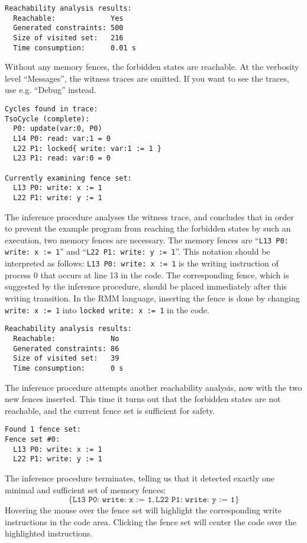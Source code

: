 \documentclass[a4paper]{article}
\begin{document}
\noindent
\begin{verbatim}
Reachability analysis results:
  Reachable:             Yes
  Generated constraints: 500
  Size of visited set:   216
  Time consumption:      0.01 s
\end{verbatim}

Without any memory fences, the forbidden states are reachable. At the
verbosity level ``Messages'', the witness traces are omitted. If you
want to see the traces, use e.g. ``Debug'' instead.

\noindent
\begin{verbatim}
Cycles found in trace:
TsoCycle (complete):
  P0: update(var:0, P0)
  L14 P0: read: var:1 = 0
  L22 P1: locked{ write: var:1 := 1 }
  L23 P1: read: var:0 = 0

Currently examining fence set:
  L13 P0: write: x := 1
  L22 P1: write: y := 1
\end{verbatim}

The inference procedure analyses the witness trace, and concludes that
in order to prevent the example program from reaching the forbidden
states by such an execution, two memory fences are necessary. The
memory fences are ``{\tt L13 P0: write: x := 1}'' and ``{\tt L22 P1:
  write: y := 1}''. This notation should be interpreted as follows:
{\tt L13 P0: write: x := 1} is the writing instruction of process 0
that occurs at line 13 in the code. The corresponding fence, which is
suggested by the inference procedure, should be placed immediately
after this writing transition. In the RMM language, inserting the
fence is done by changing {\tt write: x := 1} into {\tt locked write:
  x := 1} in the code.

\noindent
\begin{verbatim}
Reachability analysis results:
  Reachable:             No
  Generated constraints: 86
  Size of visited set:   39
  Time consumption:      0 s
\end{verbatim}

The inference procedure attempts another reachability analysis, now
with the two new fences inserted. This time it turns out that the
forbidden states are not reachable, and the current fence set is
sufficient for safety.

\noindent
\begin{verbatim}
Found 1 fence set:
Fence set #0:
  L13 P0: write: x := 1
  L22 P1: write: y := 1
\end{verbatim}

The inference procedure terminates, telling us that it detected
exactly one minimal and sufficient set of memory fences: 
\begin{displaymath}
\{\texttt{L13 P0: write: x := 1},\texttt{L22 P1: write: y := 1}\}
\end{displaymath}
Hovering the mouse over the fence set will highlight the
corresponding write instructions in the code area. Clicking the fence
set will center the code over the highlighted instructions.
\end{document}
